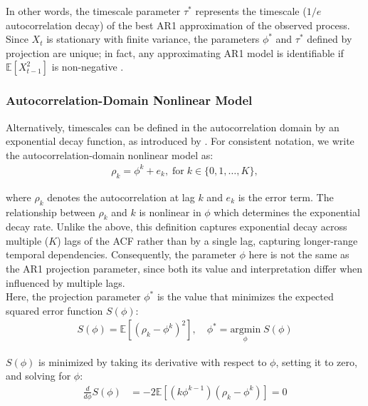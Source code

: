 \documentclass[main.tex]{subfiles}
\begin{document}
\noindent In other words, the timescale parameter $\tau^*$ represents the timescale ($1/e$ autocorrelation decay) of the best AR1 approximation of the observed process. Since $X_t$ is stationary with finite variance, the parameters $\phi^*$ and $\tau^*$ defined by projection are unique; in fact, any approximating AR1 model is identifiable if $\mathbb{E}[X_{t-1}^2]$ is non-negative \citep[Theorem~14.28]{hansen_econometrics_2022}.

\subsubsection{Autocorrelation-Domain Nonlinear Model}\label{sec:autocorrelation-domain-nonlinear-model}

Alternatively, timescales can be defined in the autocorrelation domain by an exponential decay function, as introduced by \citet{murray_hierarchy_2014}. For consistent notation, we write the autocorrelation-domain nonlinear model as:
\begin{align}\label{eq:nlm}
    \rho_k = \phi^k + e_k, \; \text{for}\; k \in \{0, 1, \ldots, K\},
\end{align}

\noindent where $\rho_k$ denotes the autocorrelation at lag $k$ and $e_k$ is the error term. The relationship between $\rho_k$ and $k$ is nonlinear in $\phi$ which determines the exponential decay rate. Unlike the  above, this definition captures exponential decay across multiple ($K$) lags of the ACF rather than by a single lag, capturing longer-range temporal dependencies. Consequently, the parameter $\phi$ here is not the same as the AR1 projection parameter, since both its value and interpretation differ when influenced by multiple lags.\\

Here, the projection parameter $\phi^*$ is the value that minimizes the expected squared error function $S(\phi)$:
\begin{align}\label{eq:nlm_loss}
    S(\phi) = \mathbb{E}[(\rho_k - \phi^k)^2], \quad \phi^* = \underset{\phi}{\text{argmin}} \; S(\phi)
\end{align}

\noindent $S(\phi)$ is minimized by taking its derivative with respect to $\phi$, setting it to zero, and solving for $\phi$:
\begin{align}
    \frac{d}{d\phi} S(\phi) &= -2\mathbb{E}[(k\phi^{k-1})(\rho_k - \phi^k)] = 0
\end{align}
\end{document}
